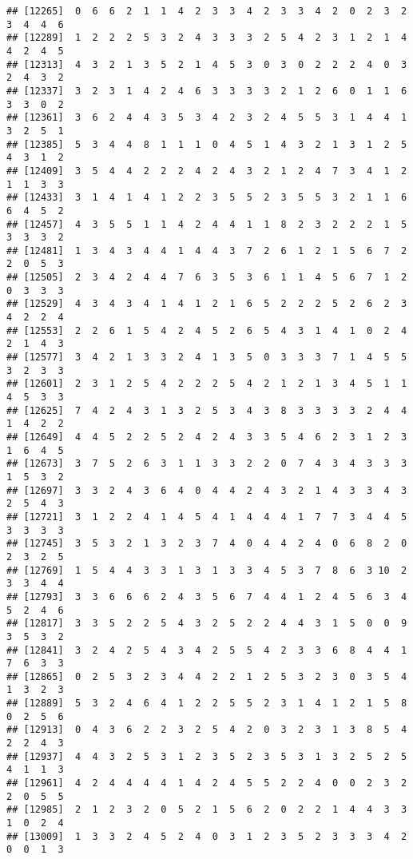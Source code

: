 \documentclass[
]{article}
\begin{document}
\begin{verbatim}
## [12265]  0  6  6  2  1  1  4  2  3  3  4  2  3  3  4  2  0  2  3  2  3  4  4  6
## [12289]  1  2  2  2  5  3  2  4  3  3  3  2  5  4  2  3  1  2  1  4  4  2  4  5
## [12313]  4  3  2  1  3  5  2  1  4  5  3  0  3  0  2  2  2  4  0  3  2  4  3  2
## [12337]  3  2  3  1  4  2  4  6  3  3  3  3  2  1  2  6  0  1  1  6  3  3  0  2
## [12361]  3  6  2  4  4  3  5  3  4  2  3  2  4  5  5  3  1  4  4  1  3  2  5  1
## [12385]  5  3  4  4  8  1  1  1  0  4  5  1  4  3  2  1  3  1  2  5  4  3  1  2
## [12409]  3  5  4  4  2  2  2  4  2  4  3  2  1  2  4  7  3  4  1  2  1  1  3  3
## [12433]  3  1  4  1  4  1  2  2  3  5  5  2  3  5  5  3  2  1  1  6  6  4  5  2
## [12457]  4  3  5  5  1  1  4  2  4  4  1  1  8  2  3  2  2  2  1  5  3  3  3  2
## [12481]  1  3  4  3  4  4  1  4  4  3  7  2  6  1  2  1  5  6  7  2  2  0  5  3
## [12505]  2  3  4  2  4  4  7  6  3  5  3  6  1  1  4  5  6  7  1  2  0  3  3  3
## [12529]  4  3  4  3  4  1  4  1  2  1  6  5  2  2  2  5  2  6  2  3  4  2  2  4
## [12553]  2  2  6  1  5  4  2  4  5  2  6  5  4  3  1  4  1  0  2  4  2  1  4  3
## [12577]  3  4  2  1  3  3  2  4  1  3  5  0  3  3  3  7  1  4  5  5  3  2  3  3
## [12601]  2  3  1  2  5  4  2  2  2  5  4  2  1  2  1  3  4  5  1  1  4  5  3  3
## [12625]  7  4  2  4  3  1  3  2  5  3  4  3  8  3  3  3  3  2  4  4  1  4  2  2
## [12649]  4  4  5  2  2  5  2  4  2  4  3  3  5  4  6  2  3  1  2  3  1  6  4  5
## [12673]  3  7  5  2  6  3  1  1  3  3  2  2  0  7  4  3  4  3  3  3  1  5  3  2
## [12697]  3  3  2  4  3  6  4  0  4  4  2  4  3  2  1  4  3  3  4  3  2  5  4  3
## [12721]  3  1  2  2  4  1  4  5  4  1  4  4  4  1  7  7  3  4  4  5  3  3  3  3
## [12745]  3  5  3  2  1  3  2  3  7  4  0  4  4  2  4  0  6  8  2  0  2  3  2  5
## [12769]  1  5  4  4  3  3  1  3  1  3  3  4  5  3  7  8  6  3 10  2  3  3  4  4
## [12793]  3  3  6  6  6  2  4  3  5  6  7  4  4  1  2  4  5  6  3  4  5  2  4  6
## [12817]  3  3  5  2  2  5  4  3  2  5  2  2  4  4  3  1  5  0  0  9  3  5  3  2
## [12841]  3  2  4  2  5  4  3  4  2  5  5  4  2  3  3  6  8  4  4  1  7  6  3  3
## [12865]  0  2  5  3  2  3  4  4  2  2  1  2  5  3  2  3  0  3  5  4  1  3  2  3
## [12889]  5  3  2  4  6  4  1  2  2  5  5  2  3  1  4  1  2  1  5  8  0  2  5  6
## [12913]  0  4  3  6  2  2  3  2  5  4  2  0  3  2  3  1  3  8  5  4  2  2  4  3
## [12937]  4  4  3  2  5  3  1  2  3  5  2  3  5  3  1  3  2  5  2  5  4  1  1  3
## [12961]  4  2  4  4  4  4  1  4  2  4  5  5  2  2  4  0  0  2  3  2  2  0  5  5
## [12985]  2  1  2  3  2  0  5  2  1  5  6  2  0  2  2  1  4  4  3  3  1  0  2  4
## [13009]  1  3  3  2  4  5  2  4  0  3  1  2  3  5  2  3  3  3  4  2  0  0  1  3

\end{verbatim}
\end{document}
